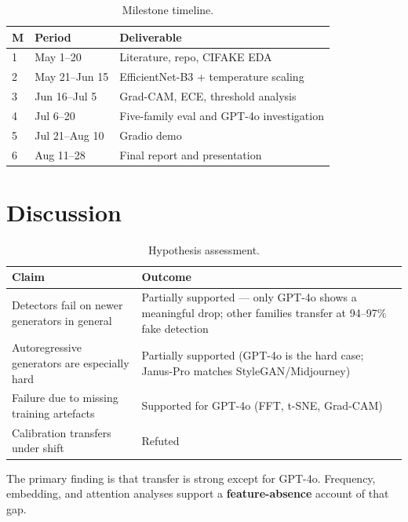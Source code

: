 \documentclass[12pt,a4paper]{article}
\begin{document}
\begin{table}[ht]
\centering
\caption{Milestone timeline.}
\label{tab:timeline}
\begin{tabular}{lll}
\toprule
\textbf{M} & \textbf{Period} & \textbf{Deliverable} \\
\midrule
1 & May 1--20 & Literature, repo, CIFAKE EDA \\
2 & May 21--Jun 15 & EfficientNet-B3 + temperature scaling \\
3 & Jun 16--Jul 5 & Grad-CAM, ECE, threshold analysis \\
4 & Jul 6--20 & Five-family eval and GPT-4o investigation \\
5 & Jul 21--Aug 10 & Gradio demo \\
6 & Aug 11--28 & Final report and presentation \\
\bottomrule
\end{tabular}
\end{table}

\section{Discussion}

\begin{table}[ht]
\centering
\caption{Hypothesis assessment.}
\label{tab:hyp}
\begin{tabular}{>{\raggedright\arraybackslash}p{6.4cm}>{\raggedright\arraybackslash}p{7.4cm}}
\toprule
\textbf{Claim} & \textbf{Outcome} \\
\midrule
Detectors fail on newer generators in general & Partially supported --- only GPT-4o shows a meaningful drop; other families transfer at 94--97\% fake detection \\
Autoregressive generators are especially hard & Partially supported (GPT-4o is the hard case; Janus-Pro matches StyleGAN/Midjourney) \\
Failure due to missing training artefacts & Supported for GPT-4o (FFT, t-SNE, Grad-CAM) \\
Calibration transfers under shift & Refuted \\
\bottomrule
\end{tabular}
\end{table}

The primary finding is that transfer is strong except for GPT-4o. Frequency, embedding, and attention analyses support a \textbf{feature-absence} account of that gap.
\end{document}
